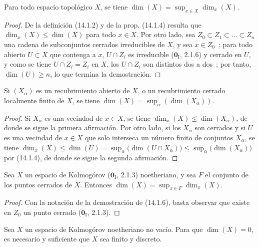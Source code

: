 \begin{proposition}[14.1.6]
\label{0.14.1.6-fr}
Para todo espacio topológico $X$, se tiene
$\dim(X)=\sup_{x\in X}\dim_x(X)$.
\end{proposition}

\begin{proof}
De la definición (14.1.2) y de la prop. (14.1.4) resulta que
$\dim_x(X)\leq\dim(X)$ para todo $x\in X$. Por otro lado, sea
$Z_0\subset Z_1\subset\ldots\subset Z_n$ una cadena de subconjuntos cerrados
irreducibles de $X$, y sea $x\in Z_0$~; para todo abierto $U\subset X$
que contenga a $x$, $U\cap Z_i$ es irreducible ($\mathbf{0}_{\mathrm I}$, 2.1.6) y
cerrado en $U$, y como se tiene $\overline{U\cap Z_i}=Z_i$ en $X$, los
$U\cap Z_i$ son distintos dos a dos~; por tanto, $\dim(U)\geq n$, lo que
termina la demostración.
\end{proof}

\begin{corollary}[14.1.7]
\label{0.14.1.7-fr}
Si $(X_\alpha)$ es un recubrimiento abierto de $X$, o un recubrimiento cerrado
localmente finito de $X$, se tiene
$\dim(X)=\sup_\alpha(\dim(X_\alpha))$.
\end{corollary}

\begin{proof}
Si $X_\alpha$ es una vecindad de $x\in X$, se tiene
$\dim_x(X)\leq\dim(X_\alpha)$, de donde se sigue la primera afirmación. Por otro
lado, si los $X_\alpha$ son cerrados y si $U$ es una vecindad de $x\in X$ que
solo interseca un número finito de conjuntos $X_\alpha$, se tiene
$\dim_x(X)\leq\dim(U)=\sup_\alpha\bigl(\dim(U\cap X_\alpha)\bigr)
\leq\sup_\alpha\bigl(\dim(X_\alpha)\bigr)$
por (14.1.4), de donde se sigue la segunda afirmación.
\end{proof}

\begin{corollary}[14.1.8]
\label{0.14.1.8-fr}
Sea $X$ un espacio de Kolmogórov \textup{($\mathbf{0}_{\mathrm I}$, 2.1.3)} noetheriano, y
sea $F$ el conjunto de los puntos cerrados de $X$. Entonces
$\dim(X)=\sup_{x\in F}\dim_x(X)$.
\end{corollary}

\begin{proof}
Con la notación de la demostración de (14.1.6), basta observar
que existe en $Z_0$ un punto cerrado ($\mathbf{0}_{\mathrm I}$, 2.1.3).
\end{proof}

\begin{proposition}[14.1.9]
\label{0.14.1.9-fr}
Sea $X$ un espacio de Kolmogórov noetheriano no vacío. Para que
$\dim(X)=0$, es necesario y suficiente que $X$ sea finito y discreto.
\end{proposition}

